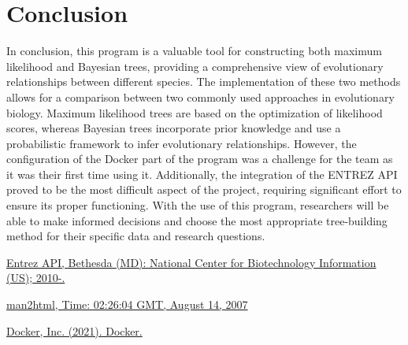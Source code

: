 \documentclass[12pt]{article}
\begin{document}
\section{Conclusion}\label{sec:conclusoes}
In conclusion, this program is a valuable tool for constructing both maximum likelihood and Bayesian trees, providing a comprehensive view of evolutionary relationships between different species. The implementation of these two methods allows for a comparison between two commonly used approaches in evolutionary biology. Maximum likelihood trees are based on the optimization of likelihood scores, whereas Bayesian trees incorporate prior knowledge and use a probabilistic framework to infer evolutionary relationships. However, the configuration of the Docker part of the program was a challenge for the team as it was their first time using it. Additionally, the integration of the ENTREZ API proved to be the most difficult aspect of the project, requiring significant effort to ensure its proper functioning. With the use of this program, researchers will be able to make informed decisions and choose the most appropriate tree-building method for their specific data and research questions.


\begin{thebibliography}{}

\href{https://www.ncbi.nlm.nih.gov/books/NBK25501/}{Entrez API, Bethesda (MD): National Center for Biotechnology Information (US); 2010-.}

\href{https://mafft.cbrc.jp/alignment/software/}{man2html, Time: 02:26:04 GMT, August 14, 2007}

\href{https://docs.docker.com}{Docker, Inc. (2021). Docker. }


\end{thebibliography}
\newpage
\end{document}
